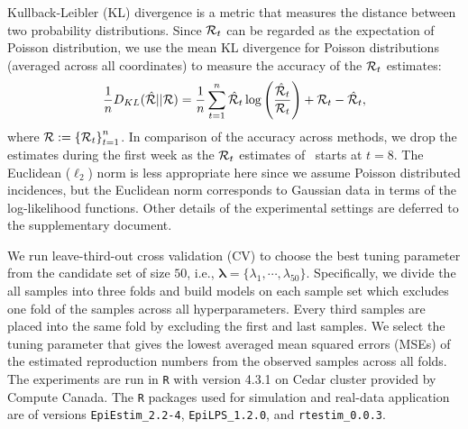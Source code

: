 Kullback-Leibler (KL) divergence is a metric that measures the distance between two probability distributions. Since $\mathcal{R}_t$ can be regarded as the expectation of Poisson distribution, we use the mean KL divergence for Poisson distributions (averaged across all coordinates) to measure the accuracy of the $\mathcal{R}_t$ estimates: 
$$\frac{1}{n} D_{KL}(\hat{\mathcal{R}}|| \mathcal{R}) = \frac{1}{n}\sum_{t=1}^n \hat{\mathcal{R}}_t \log\left(\frac{\hat{\mathcal{R}}_t}{\mathcal{R}_t}\right) + {\mathcal{R}}_t - \hat{\mathcal{R}}_t,$$ 
where $\mathcal{R} := \left\{ \mathcal{R}_t \right\}_{t=1}^n$. %
In comparison of the accuracy across methods, we drop the estimates during the first week as the $\mathcal{R}_t$ estimates of \EpiEstim\ starts at $t=8$.  
The Euclidean ($\ell_2$) norm is less appropriate here since we assume Poisson distributed incidences, but the Euclidean norm corresponds to Gaussian data in terms of the log-likelihood functions. 
Other details of the experimental settings are deferred to the supplementary document. 

We run leave-third-out cross validation (CV) to choose the best tuning parameter from the candidate set of size $50$, i.e., $\boldsymbol{\lambda} = \{\lambda_1, \cdots, \lambda_{50}\}$. Specifically, we divide the all samples into three folds and build models on each sample set which excludes one fold of the samples across all hyperparameters. Every third samples are placed into the same fold by excluding the first and last samples. We select the tuning parameter that gives the lowest averaged mean squared errors (MSEs) of the estimated reproduction numbers from the observed samples across all folds. 
The experiments are run in \texttt{R} with version 4.3.1 on Cedar cluster provided by Compute Canada. The \texttt{R} packages used for simulation and real-data application are of versions \texttt{EpiEstim\_2.2-4}, \texttt{EpiLPS\_1.2.0}, and \texttt{rtestim\_0.0.3}. 

